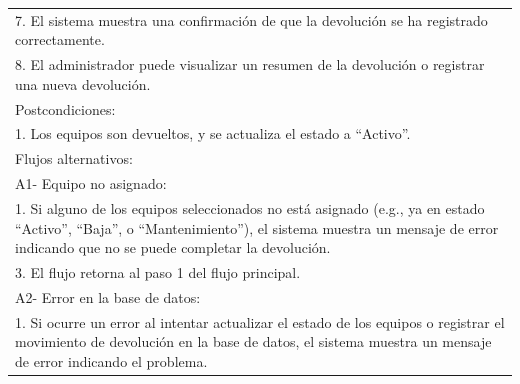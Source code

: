 \documentclass[stu, 12pt, letterpaper, donotrepeattitle, floatsintext, natbib]{apa7}
\begin{document}
\begin{longtable}{@{} p{16.5cm} @{}}
    7. El sistema muestra una confirmación de que la devolución se ha registrado correctamente.                                                                                                                                      \\
    8. El administrador puede visualizar un resumen de la devolución o registrar una nueva devolución.                                                                                                                               \\ \midrule
    Postcondiciones:                                                                                                                                                                                                                 \\
    1. Los equipos son devueltos, y se actualiza el estado a ``Activo''.                                                                                                                                                             \\ \midrule
    Flujos alternativos:                                                                                                                                                                                                             \\
    A1- Equipo no asignado:                                                                                                                                                                                                          \\
    \hspace{1cm}1. Si alguno de los equipos seleccionados no está asignado (e.g., ya en estado ``Activo'', ``Baja'', o ``Mantenimiento''), el sistema muestra un mensaje de error indicando que no se puede completar la devolución. \\
    \hspace{1cm}3. El flujo retorna al paso 1 del flujo principal.                                                                                                                                                                   \\
    A2- Error en la base de datos:                                                                                                                                                                                                   \\
    \hspace{1cm}1. Si ocurre un error al intentar actualizar el estado de los equipos o registrar el movimiento de devolución en la base de datos, el sistema muestra un mensaje de error indicando el problema.                     \\

\end{longtable}
\end{document}
